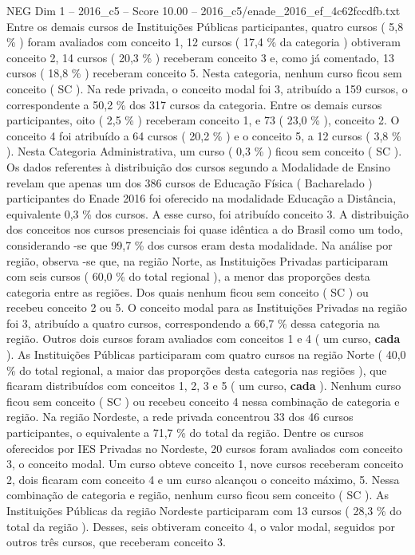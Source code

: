 \begin{textsample}{NEG Dim 1 – 2016\_c5 – Score 10.00 – 2016\_c5/enade\_2016\_ef\_4c62fccdfb.txt}
Entre os demais cursos de Instituições Públicas participantes, quatro cursos ( 5,8 \% ) foram avaliados com conceito 1, 12 cursos ( 17,4 \% da categoria ) obtiveram conceito 2, 14 cursos ( 20,3 \% ) receberam conceito 3 e, como já comentado, 13 cursos ( 18,8 \% ) receberam conceito 5.
Nesta categoria, nenhum curso ficou sem conceito ( SC ).
Na rede privada, o conceito modal foi 3, atribuído a 159 cursos, o correspondente a 50,2 \% dos 317 cursos da categoria.
Entre os demais cursos participantes, oito ( 2,5 \% ) receberam conceito 1, e 73 ( 23,0 \% ), conceito 2.
O conceito 4 foi atribuído a 64 cursos ( 20,2 \% ) e o conceito 5, a 12 cursos ( 3,8 \% ).
Nesta Categoria Administrativa, um curso ( 0,3 \% ) ficou sem conceito ( SC ).
Os dados referentes à distribuição dos cursos segundo a Modalidade de Ensino revelam que apenas um dos 386 cursos de Educação Física ( Bacharelado ) participantes do Enade 2016 foi oferecido na modalidade Educação a Distância, equivalente 0,3 \% dos cursos.
A esse curso, foi atribuído conceito 3.
A distribuição dos conceitos nos cursos presenciais foi quase idêntica a do Brasil como um todo, considerando -se que 99,7 \% dos cursos eram desta modalidade.
Na análise por região, observa -se que, na região Norte, as Instituições Privadas participaram com seis cursos ( 60,0 \% do total regional ), a menor das proporções desta categoria entre as regiões.
Dos quais nenhum ficou sem conceito ( SC ) ou recebeu conceito 2 ou 5.
O conceito modal para as Instituições Privadas na região foi 3, atribuído a quatro cursos, correspondendo a 66,7 \% dessa categoria na região.
Outros dois cursos foram avaliados com conceitos 1 e 4 ( um curso, \textbf{cada} ).
As Instituições Públicas participaram com quatro cursos na região Norte ( 40,0 \% do total regional, a maior das proporções desta categoria nas regiões ), que ficaram distribuídos com conceitos 1, 2, 3 e 5 ( um curso, \textbf{cada} ).
Nenhum curso ficou sem conceito ( SC ) ou recebeu conceito 4 nessa combinação de categoria e região.
Na região Nordeste, a rede privada concentrou 33 dos 46 cursos participantes, o equivalente a 71,7 \% do total da região.
Dentre os cursos oferecidos por IES Privadas no Nordeste, 20 cursos foram avaliados com conceito 3, o conceito modal.
Um curso obteve conceito 1, nove cursos receberam conceito 2, dois ficaram com conceito 4 e um curso alcançou o conceito máximo, 5.
Nessa combinação de categoria e região, nenhum curso ficou sem conceito ( SC ).
As Instituições Públicas da região Nordeste participaram com 13 cursos ( 28,3 \% do total da região ).
Desses, seis obtiveram conceito 4, o valor modal, seguidos por outros três cursos, que receberam conceito 3.

\end{textsample}
